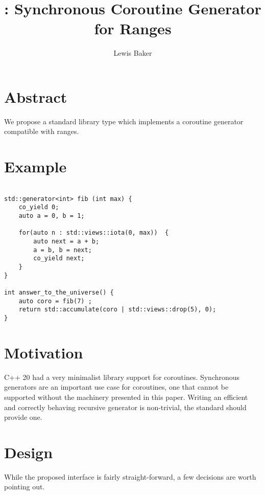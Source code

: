 \documentclass{wg21}
\title{\tcode{std::generator}: Synchronous Coroutine Generator for Ranges}
\author{Lewis Baker}{lbaker@fb.com }
\begin{document}
\maketitle


\section{Abstract}

We propose a standard library type  which implements a coroutine generator compatible with ranges.

\section{Example}
\begin{lstlisting}[style=color]

std::generator<int> fib (int max) {
    co_yield 0;
    auto a = 0, b = 1;
    
    for(auto n : std::views::iota(0, max))  {
        auto next = a + b;
        a = b, b = next;
        co_yield next;
    }
}

int answer_to_the_universe() {
    auto coro = fib(7) ;
    return std::accumulate(coro | std::views::drop(5), 0);
}

\end{lstlisting}

\section{Motivation}

C++ 20 had a very minimalist library support for coroutines.
Synchronous generators are an important use case for coroutines, one that cannot be supported without 
the machinery presented in this paper.
Writing an efficient and correctly behaving recursive generator is non-trivial, the standard should provide one.

 
\section{Design}

While the proposed  interface is fairly straight-forward, a few decisions are worth pointing out.

\subsection{}
\end{document}
